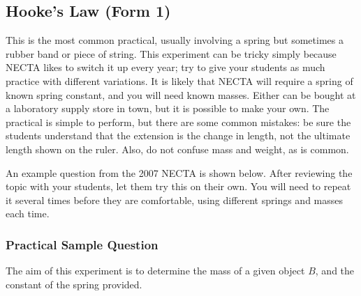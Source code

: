 \subsection{Hooke’s Law (Form 1)}

This is the most common practical, usually involving a spring but sometimes a
rubber band or piece of string. This experiment can be tricky simply because NECTA
likes to switch it up every year; try to give your students as much practice with different
variations. It is likely that NECTA will require a spring of known spring constant, and
you will need known masses. Either can be bought at a laboratory supply store in town,
but it is possible to make your own. The practical is simple to perform, but there are
some common mistakes: be sure the students understand that the extension is the change
in length, not the ultimate length shown on the ruler. Also, do not confuse mass and
weight, as is common.

An example question from the 2007 NECTA is shown below. After reviewing
the topic with your students, let them try this on their own. You will need to repeat it
several times before they are comfortable, using different springs and masses each time.

\subsubsection{Practical Sample Question}

The aim of this experiment is to determine the mass of a given object $B$, and the
constant of the spring provided.


